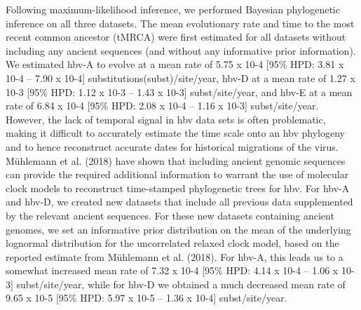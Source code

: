 

Following maximum-likelihood inference, we performed Bayesian phylogenetic inference on all three datasets. The mean evolutionary rate and time to the most recent common ancestor (tMRCA) were first estimated for all datasets without including any ancient sequences (and without any informative prior information). We estimated \gls{hbv}-A to evolve at a mean rate of 5.75 x 10-4 [95\% HPD: 3.81 x 10-4 – 7.90 x 10-4] substitutions(subst)/site/year, \gls{hbv}-D at a mean rate of 1.27 x 10-3 [95\% HPD: 1.12 x 10-3 – 1.43 x 10-3] subst/site/year, and \gls{hbv}-E at a mean rate of 6.84 x 10-4 [95\% HPD: 2.08 x 10-4 – 1.16 x 10-3] subst/site/year. However, the lack of temporal signal in \gls{hbv} data sets is often problematic, making it difficult to accurately estimate the time scale onto an \gls{hbv} phylogeny and to hence reconstruct accurate dates for historical migrations of the virus. Mühlemann et al. (2018) have shown that including ancient genomic sequences can provide the required additional information to warrant the use of molecular clock models to reconstruct time-stamped phylogenetic trees for \gls{hbv}. For \gls{hbv}-A and \gls{hbv}-D, we created new datasets that include all previous data supplemented by the relevant ancient sequences. For these new datasets containing ancient genomes, we set an informative prior distribution on the mean of the underlying lognormal distribution for the uncorrelated relaxed clock model, based on the reported estimate from Mühlemann et al. (2018). For \gls{hbv}-A, this leads us to a somewhat increased mean rate of 7.32 x 10-4 [95\% HPD: 4.14 x 10-4 – 1.06 x 10-3] subst/site/year, while for \gls{hbv}-D we obtained a much decreased mean rate of 9.65 x 10-5 [95\% HPD: 5.97 x 10-5 – 1.36 x 10-4] subst/site/year.

